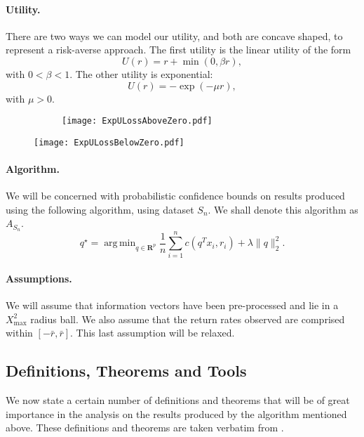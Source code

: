 \documentclass[11pt]{article}
\DeclareMathOperator*{\argmin}{arg\,min}
\newcommand{\real}{\bm R}
\theoremstyle{plain}
\theoremstyle{definition}
\begin{document}
\paragraph{Utility.}
There are two ways we can model our utility, and both are concave shaped, to represent a
risk-averse approach. The first utility is the linear utility of the form
\begin{equation}
  U(r) = r + \min(0, \beta r),
\end{equation}
with $0<\beta<1$. The other utility is exponential:
\begin{equation}
  U(r) = -\exp(-\mu r),
\end{equation}
with $\mu > 0$.

\begin{figure}
  \centering
  \begin{subfigure}{.4\textwidth}
  \texttt{[image: ExpULossAboveZero.pdf]}
\end{subfigure}%
\begin{minipage}{.4\textwidth}
  \texttt{[image: ExpULossBelowZero.pdf]}
\end{minipage}
\end{figure}

\paragraph{Algorithm.}
We will be concerned with probabilistic confidence bounds on results produced using the
following algorithm, using dataset $S_n$. We shall denote this algorithm as $A_{S_n}$.
\begin{equation}
  \label{algo}
  q^\star = \argmin_{q\in\real^p}\frac{1}{n} \sum_{i=1}^{n} c(q^Tx_i,r_i) + \lambda\|q\|^2_2.
\end{equation}

\paragraph{Assumptions.}
We will assume that information vectors have been pre-processed and lie in a $X^2_{\max}$
radius ball. We also assume that the return rates observed are comprised within $[-\bar r,
\bar r]$. This last assumption will be relaxed. 

\subsection{Definitions, Theorems and Tools}
We now state a certain number of definitions and theorems that will be of great importance
in the analysis on the results produced by the algorithm mentioned above. These
definitions and theorems are taken verbatim from \cite{bousquet2002}.
\end{document}
